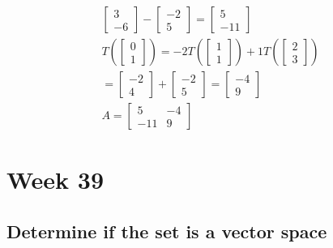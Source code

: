 \documentclass[12pt, a4paper]{article}
\begin{document}
\begin{align*}
\begin{bmatrix}
					3 \\
					-6
				\end{bmatrix}-
				\begin{bmatrix}
					-2 \\
					5
				\end{bmatrix}=\begin{bmatrix}
					5 \\
					-11
				\end{bmatrix}\\
				T(
				\begin{bmatrix}
					0 \\
					1
				\end{bmatrix})=-2T(
				\begin{bmatrix}
					1 \\
					1
				\end{bmatrix})+1T(
				\begin{bmatrix}
					2 \\
					3
				\end{bmatrix})\\
				=\begin{bmatrix}
					-2 \\
					4
				\end{bmatrix}+
				\begin{bmatrix}
					-2 \\
					5
				\end{bmatrix}=\begin{bmatrix}
					-4 \\
					9
				\end{bmatrix}\\[4mm]
				A=\begin{bmatrix}
				5&-4\\
				-11 & 9
					\end{bmatrix}
			\end{align*}
	\section{Week 39}
		\subsection{Determine if the set is a vector space}
\end{document}
